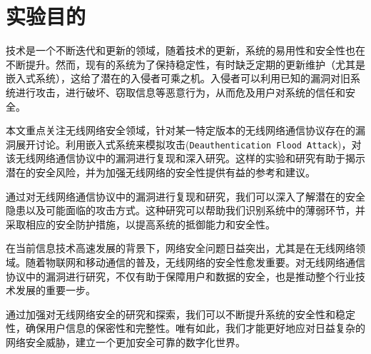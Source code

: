 \documentclass[../main.tex]{subfiles}
\begin{document}
\section{实验目的}
技术是一个不断迭代和更新的领域，随着技术的更新，系统的易用性和安全性也在不断提升。然而，现有的系统为了保持稳定性，有时缺乏定期的更新维护（尤其是嵌入式系统），这给了潜在的入侵者可乘之机。入侵者可以利用已知的漏洞对旧系统进行攻击，进行破坏、窃取信息等恶意行为，从而危及用户对系统的信任和安全。

本文重点关注无线网络安全领域，针对某一特定版本的无线网络通信协议存在的漏洞展开讨论。利用嵌入式系统来模拟攻击(\texttt{Deauthentication
Flood Attack})，对该无线网络通信协议中的漏洞进行复现和深入研究。这样的实验和研究有助于揭示潜在的安全风险，并为加强无线网络的安全性提供有益的参考和建议。

通过对无线网络通信协议中的漏洞进行复现和研究，我们可以深入了解潜在的安全隐患以及可能面临的攻击方式。这种研究可以帮助我们识别系统中的薄弱环节，并采取相应的安全防护措施，以提高系统的抵御能力和安全性。

在当前信息技术高速发展的背景下，网络安全问题日益突出，尤其是在无线网络领域。随着物联网和移动通信的普及，无线网络的安全性愈发重要。对无线网络通信协议中的漏洞进行研究，不仅有助于保障用户和数据的安全，也是推动整个行业技术发展的重要一步。

通过加强对无线网络安全的研究和探索，我们可以不断提升系统的安全性和稳定性，确保用户信息的保密性和完整性。唯有如此，我们才能更好地应对日益复杂的网络安全威胁，建立一个更加安全可靠的数字化世界。
\end{document}
